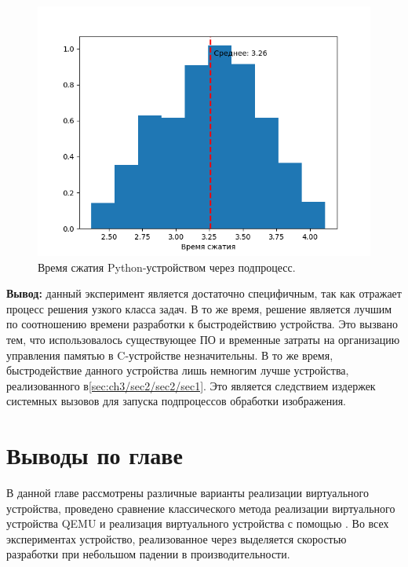 \begin{figure}[!htbp]
    \centering
    \begin{adjustbox}{max totalsize={0.8\textwidth}{\textheight}}
        \includegraphics{images/hist-exec-py-dev.png}
    \end{adjustbox}
    \caption{Время сжатия Python-устройством через подпроцесс.}\label{fig:hist-exec-py-dev}
\end{figure}

\textbf{Вывод:} данный эксперимент является достаточно специфичным, так как отражает процесс
решения узкого класса задач. В то же время, решение является лучшим по соотношению
времени разработки к быстродействию устройства.
Это вызвано тем, что использовалось существующее ПО и временные затраты на
организацию управления памятью в C-устройстве незначительны.
В то же время, быстродействие данного устройства лишь немногим лучше устройства,
реализованного в\cref{sec:ch3/sec2/sec2/sec1}. Это является следствием издержек
системных вызовов для запуска подпроцессов обработки изображения.


\section*{Выводы по главе}\label{sec:ch3/sec3}

В данной главе рассмотрены различные варианты реализации виртуального
устройства, проведено сравнение классического метода реализации виртуального устройства
QEMU и реализация виртуального устройства с помощью {\mylanguage}.
Во всех экспериментах устройство, реализованное через {\mylanguage} выделяется
скоростью разработки при небольшом падении в производительности.
